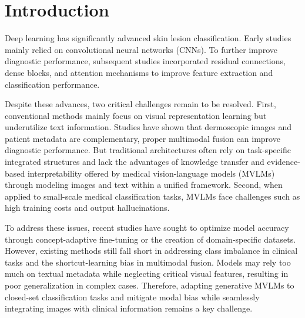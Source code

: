 \documentclass[preprint,12pt]{elsarticle}
\begin{document}


\section{Introduction}


Deep learning has significantly advanced skin lesion classification. Early studies mainly relied on convolutional neural networks (CNNs). To further improve diagnostic performance, subsequent studies incorporated residual connections, dense blocks, and attention mechanisms to improve feature extraction and classification performance\cite{yu2017melanoma,hosny2022refined,wu2020skin}. 

Despite these advances, two critical challenges remain to be resolved. 
First, conventional methods mainly focus on visual representation learning but underutilize text information. Studies have shown that dermoscopic images and patient metadata are complementary, proper multimodal fusion can improve diagnostic performance\cite{pacheco2020impact, khurshid2025multimodal}. But traditional architectures often rely on task-specific integrated structures and lack the advantages of knowledge transfer and evidence-based interpretability offered by medical vision-language models (MVLMs) through modeling images and text within a unified framework. Second, when applied to small-scale medical classification tasks, MVLMs face challenges such as 
high training costs and output hallucinations\cite{zhu2026concept,zeng2025mmskin,sellergren2025medgemma}.


To address these issues, recent studies have sought to optimize model accuracy through concept-adaptive fine-tuning or the creation of domain-specific datasets\cite{zhu2026concept,zeng2025mmskin}. However, existing methods still fall short in addressing class imbalance in clinical tasks and the shortcut-learning bias in multimodal fusion\cite{watson2026multimodal}. Models may rely too much on textual metadata while neglecting critical visual features, resulting in poor generalization in complex cases. Therefore, adapting generative MVLMs to closed-set classification tasks and mitigate modal bias while seamlessly integrating images with clinical information remains a key challenge.
\end{document}
